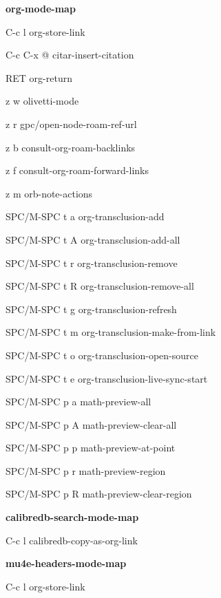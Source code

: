 \documentclass[10pt]{article}
\renewcommand\subsection[1]{\smallskip\par\textbf{\color{heading}#1}}
\begin{document}
\begin{multicols}{4}
  \subsection{org-mode-map}
  \begin{keylist}
    \item[C-c l] org-store-link
    \item[C-c C-x @] citar-insert-citation
    \item[RET] org-return
    \item[z w] olivetti-mode
    \item[z r] gpc/open-node-roam-ref-url
    \item[z b] consult-org-roam-backlinks
    \item[z f] consult-org-roam-forward-links
    \item[z m] orb-note-actions
    \item[SPC/M-SPC t a] org-transclusion-add
    \item[SPC/M-SPC t A] org-transclusion-add-all
    \item[SPC/M-SPC t r] org-transclusion-remove
    \item[SPC/M-SPC t R] org-transclusion-remove-all
    \item[SPC/M-SPC t g] org-transclusion-refresh
    \item[SPC/M-SPC t m] org-transclusion-make-from-link
    \item[SPC/M-SPC t o] org-transclusion-open-source
    \item[SPC/M-SPC t e] org-transclusion-live-sync-start
    \item[SPC/M-SPC p a] math-preview-all
    \item[SPC/M-SPC p A] math-preview-clear-all
    \item[SPC/M-SPC p p] math-preview-at-point
    \item[SPC/M-SPC p r] math-preview-region
    \item[SPC/M-SPC p R] math-preview-clear-region
  \end{keylist}

  \subsection{calibredb-search-mode-map}
  \begin{keylist}
    \item[C-c l] calibredb-copy-as-org-link
  \end{keylist}

  \subsection{mu4e-headers-mode-map}
  \begin{keylist}
    \item[C-c l] org-store-link
  \end{keylist}


\end{multicols}
\end{document}
